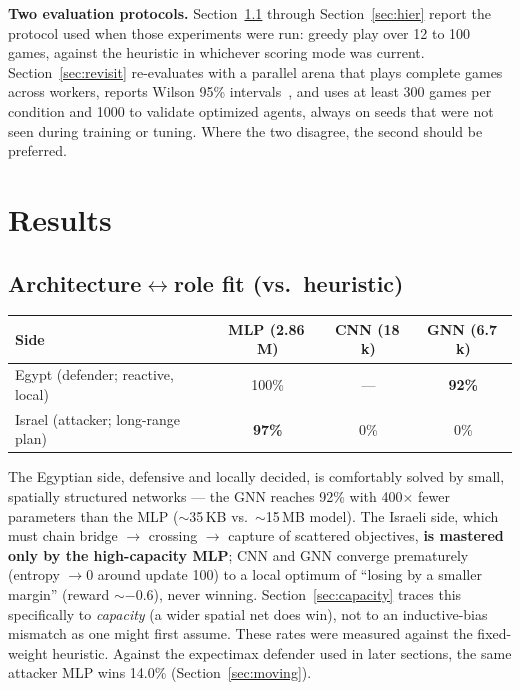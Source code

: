 \documentclass{article}
\begin{document}
\textbf{Two evaluation protocols.} Section~\ref{sec:archfit} through
Section~\ref{sec:hier} report the protocol used when those experiments were run: greedy
play over 12 to 100 games, against the heuristic in whichever scoring mode was current.
Section~\ref{sec:revisit} re-evaluates with a parallel arena that plays complete games
across workers, reports Wilson 95\% intervals~\cite{wilson}, and uses at least 300 games
per condition and 1000 to validate optimized agents, always on seeds that were not seen
during training or tuning. Where the two disagree, the second should be preferred.

\section{Results}

\subsection{Architecture$\leftrightarrow$role fit (vs.\ heuristic)}
\label{sec:archfit}
\begin{center}
\begin{tabular}{lccc}
\toprule
\textbf{Side} & \textbf{MLP (2.86\,M)} & \textbf{CNN (18\,k)} & \textbf{GNN (6.7\,k)} \\
\midrule
Egypt (defender; reactive, local) & 100\% & --- & \textbf{92\%} \\
Israel (attacker; long-range plan) & \textbf{97\%} & 0\% & 0\% \\
\bottomrule
\end{tabular}
\end{center}

The Egyptian side, defensive and locally decided, is comfortably solved by small,
spatially structured networks --- the GNN reaches 92\% with 400$\times$ fewer parameters
than the MLP ($\sim$35\,KB vs.\ $\sim$15\,MB model). The Israeli side, which must chain
bridge $\to$ crossing $\to$ capture of scattered objectives, \textbf{is mastered only by
the high-capacity MLP}; CNN and GNN converge prematurely (entropy $\to 0$ around update
100) to a local optimum of ``losing by a smaller margin'' (reward $\sim-0.6$), never
winning. Section~\ref{sec:capacity} traces this specifically to \emph{capacity} (a wider
spatial net does win), not to an inductive-bias mismatch as one might first assume.
These rates were measured against the fixed-weight heuristic. Against the expectimax
defender used in later sections, the same attacker MLP wins 14.0\%
(Section~\ref{sec:moving}).
\end{document}
